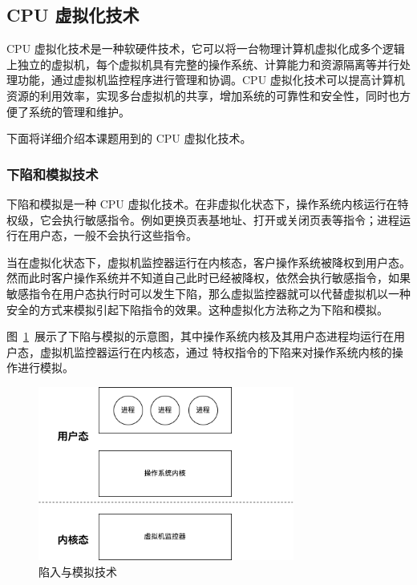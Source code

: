 \subsection{CPU 虚拟化技术}

CPU 虚拟化技术是一种软硬件技术，它可以将一台物理计算机虚拟化成多个逻辑上独立的虚拟机，每个虚拟机具有完整的操作系统、计算能力和资源隔离等并行处理功能，通过虚拟机监控程序进行管理和协调。CPU 虚拟化技术可以提高计算机资源的利用效率，实现多台虚拟机的共享，增加系统的可靠性和安全性，同时也方便了系统的管理和维护。

下面将详细介绍本课题用到的 CPU 虚拟化技术。

\subsubsection{下陷和模拟技术}
下陷和模拟是一种 CPU 虚拟化技术。在非虚拟化状态下，操作系统内核运行在特权级，它会执行敏感指令。例如更换页表基地址、打开或关闭页表等指令；进程运行在用户态，一般不会执行这些指令。

当在虚拟化状态下，虚拟机监控器运行在内核态，客户操作系统被降权到用户态。然而此时客户操作系统并不知道自己此时已经被降权，依然会执行敏感指令，如果敏感指令在用户态执行时可以发生下陷，那么虚拟监控器就可以代替虚拟机以一种安全的方式来模拟引起下陷指令的效果。这种虚拟化方法称之为下陷和模拟。\cite{陈海波2019现代操作系统}

图~\ref{fig:trap-and-emulate}~展示了下陷与模拟的示意图，其中操作系统内核及其用户态进程均运行在用户态，虚拟机监控器运行在内核态，通过 
特权指令的下陷来对操作系统内核的操作进行模拟。


\begin{figure}[]
    \centering
    \includegraphics[width=0.75\textwidth]{thesis-images/trap-and-emulate.png}
    \caption{陷入与模拟技术}\label{fig:trap-and-emulate}
\end{figure}

